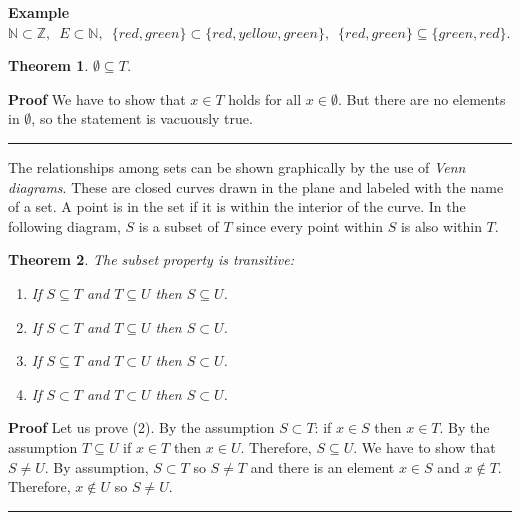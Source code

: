 \documentclass[12pt,a4paper]{article}
\newtheorem{theorem}{Theorem}
\newcommand*{\qed}{\hfill\rule[-2pt]{4pt}{10pt}}
\newcommand*{\comma}{,\:}
\newenvironment{example}{\textbf{Example}}{}
\newenvironment{proof}{\textbf{Proof}}{\qed}
\begin{document}
\begin{example}
$\mathbb{N}\subset \mathbb{Z}\comma\; E \subset \mathbb{N}\comma\; \{\mathit{red},\mathit{green}\}\subset \{\mathit{red}, \mathit{yellow}, \mathit{green}\}\comma\; \{\mathit{red},\mathit{green}\}\subseteq \{\mathit{green}, \mathit{red}\}$.
\end{example}

\begin{theorem} $\emptyset \subseteq T$.
\end{theorem}
\begin{proof}
We have to show that $x \in T$ holds for all $x\in \emptyset$. But there are no elements in $\emptyset$, so the statement is vacuously true.
\end{proof}

The relationships among sets can be shown graphically by the use
of \emph{Venn diagrams}. These are closed curves
drawn in the plane and labeled with the name of a set. A point is in the
set if it is within the interior of the curve. In the following diagram, $S$ is a subset of $T$ since every point within $S$ is also within $T$.

\begin{center}
\end{center}

\begin{theorem}The subset property is transitive:

\begin{enumerate}
\item If $S\subseteq T$ and $T\subseteq U$ then $S\subseteq U$.
\item If $S\subset T$ and $T\subseteq U$ then $S\subset U$.
\item If $S\subseteq T$ and $T\subset U$ then $S\subset U$.
\item If $S\subset T$ and $T\subset U$ then $S\subset U$.
\end{enumerate}
\end{theorem}

\begin{proof}
Let us prove (2). By the assumption $S\subset T$: if $x\in S$ then $x\in T$. By the assumption $T\subseteq U$ if $x\in T$ then $x\in U$. Therefore, $S\subseteq U$. We have to show that $S\neq U$. By assumption, $S \subset T$ so $S\neq T$ and there is an element $x\in S$ and $x\not \in T$. Therefore, $x\not \in U$ so $S\neq U$.
\end{proof}
\end{document}
